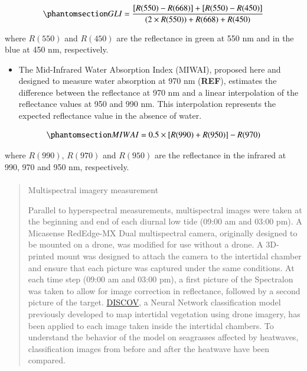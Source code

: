 \documentclass[
  number]{elsarticle}
\makeatletter
\let\oldparagraph\paragraph
\renewcommand{\paragraph}{
    \@ifstar
      \xxxParagraphStar
      \xxxParagraphNoStar
  }
\newcommand{\xxxParagraphStar}[1]{\oldparagraph*{#1}\mbox{}}
\newcommand{\xxxParagraphNoStar}[1]{\oldparagraph{#1}\mbox{}}
\providecommand{\tightlist}{%
  \setlength{\itemsep}{0pt}\setlength{\parskip}{0pt}}\usepackage{longtable,booktabs,array}
\makeatother
\begin{document}
\begin{equation}\phantomsection\label{eq-gli}{
GLI = \frac{[R(550)-R(668)]+[R(550)-R(450)]}{(2 \times R(550) )+ R(668) + R(450) }
}\end{equation}

where \(R(550)\) and \(R(450)\) are the reflectance in green at 550 nm
and in the blue at 450 nm, respectively.

\begin{itemize}
\tightlist
\item
  The Mid-Infrared Water Absorption Index (MIWAI), proposed here and
  designed to measure water absorption at 970 nm (\textbf{REF}),
  estimates the difference between the reflectance at 970 nm and a
  linear interpolation of the reflectance values at 950 and 990 nm. This
  interpolation represents the expected reflectance value in the absence
  of water.
\end{itemize}

\begin{equation}\phantomsection\label{eq-MIWAI}{
MIWAI = 0.5 \times [R(990)+R(950)]-R(970)
}\end{equation}

where \(R(990)\), \(R(970)\) and \(R(950)\) are the reflectance in the
infrared at 990, 970 and 950 nm, respectively.

\begin{quote}
\mbox{}%
\paragraph{Multispectral imagery
measurement}\label{multispectral-imagery-measurement}

Parallel to hyperspectral measurements, multispectral images were taken
at the beginning and end of each diurnal low tide (09:00 am and 03:00
pm). A Micasense RedEdge-MX Dual multispectral camera, originally
designed to be mounted on a drone, was modified for use without a drone.
A 3D-printed mount was designed to attach the camera to the intertidal
chamber and ensure that each picture was captured under the same
conditions. At each time step (09:00 am and 03:00 pm), a first picture
of the Spectralon was taken to allow for image correction in
reflectance, followed by a second picture of the target.
\href{https://sigoiry.github.io/DISCOV-MicaSense/}{DISCOV}, a Neural
Network classification model previously developed to map intertidal
vegetation using drone imagery, has been applied to each image taken
inside the intertidal chambers. To understand the behavior of the model
on seagrasses affected by heatwaves, classification images from before
and after the heatwave have been compared.
\end{quote}
\end{document}
